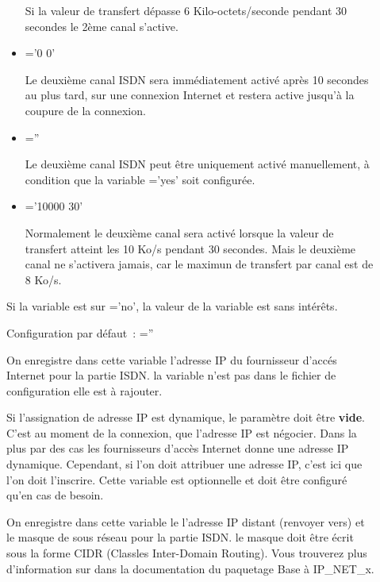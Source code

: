 \begin{description}
\begin{itemize}
   Si la valeur de transfert dépasse 6 Kilo-octets/seconde pendant 30
   secondes le 2ème canal s'active.

  \item {}='0 0'

    Le deuxième canal ISDN sera immédiatement activé après 10 secondes
    au plus tard, sur une connexion Internet et restera active jusqu'à
    la coupure de la connexion.

  \item {}=''

    Le deuxième canal ISDN peut être uniquement activé manuellement, à
    condition que la variable ='yes'
    soit configurée.

  \item {}='10000 30'

    Normalement le deuxième canal sera activé lorsque la valeur de transfert
    atteint les 10 Ko/s pendant 30 secondes. Mais le deuxième canal ne s'activera
    jamais, car le maximun de transfert par canal est de 8 Ko/s.
  \end{itemize}

  Si la variable est sur ='no', la valeur de
  la variable \linebreak {} est sans intérêts.

  Configuration par défaut~: =''


  On enregistre dans cette variable l'adresse IP du fournisseur d'accés Internet
  pour la partie ISDN. la variable n'est pas dans le fichier de configuration elle
  est à rajouter.

  Si l'\-assi\-gna\-tion de adresse IP est dynamique, le paramètre doit être
  \textbf{vide}. C'est au moment de la connexion, que l'adresse IP est négocier.
  Dans la plus par des cas les fournisseurs d'accès Internet donne une adresse IP
  dynamique. Cependant, si l'on doit attribuer une adresse IP, c'est ici que
  l'on doit l'inscrire. Cette variable est optionnelle et doit être configuré
  qu'en cas de besoin.


  On enregistre dans cette variable le l'adresse IP distant (renvoyer vers) et
  le masque de sous réseau pour la partie ISDN. le masque doit être écrit sous
  la forme CIDR (Classles Inter-Domain Routing). Vous trouverez plus d'information
  sur  dans la documentation du paquetage Base à IP\_NET\_x.


\end{description}
